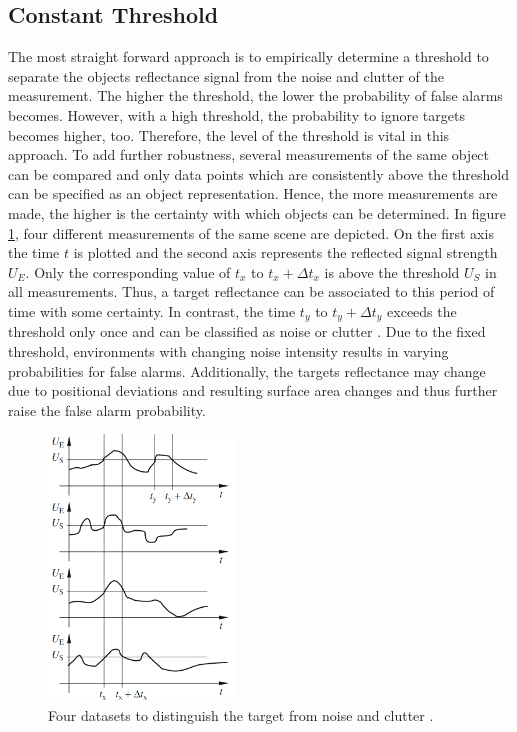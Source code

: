    \subsection{Constant Threshold} \label{constThresh}
   The most straight forward approach is to empirically determine a threshold to separate the objects reflectance signal from the noise and clutter of the measurement. The higher the threshold, the lower the probability of false alarms becomes. However, with a high threshold, the probability to ignore targets becomes higher, too. Therefore, the level of the threshold is vital in this approach. To add further robustness, several measurements of the same object can be compared and only data points which are consistently above the threshold can be specified as an object representation. Hence, the more measurements are made, the higher is the certainty with which objects can be determined. In figure \ref{fig_ConseqRADAR}, four different measurements of the same scene are depicted. On the first axis the time $t$ is plotted and the second axis represents the reflected signal strength $U_E$. Only the corresponding value of $t_x$ to $t_x+\Delta t_x$ is above the threshold $U_S$ in all measurements. Thus, a target reflectance can be associated to this period of time with some certainty. In contrast, the time $t_y$ to $t_y+\Delta t_y$ exceeds the threshold only once and can be classified as noise or clutter \cite{Funk}. Due to the fixed threshold, environments with changing noise intensity results in varying probabilities for false alarms. Additionally, the targets reflectance may change due to positional deviations and resulting surface area changes and thus further raise the false alarm probability. 
   \begin{figure}
   	\begin{centering}
   		\includegraphics[width=5cm,keepaspectratio]{Bilder/ConseqRADAR.png}
   		\caption{Four datasets to distinguish the target from noise and clutter \cite{Funk}.}
   		\label{fig_ConseqRADAR}%
   	\end{centering}
   \end{figure}
       
